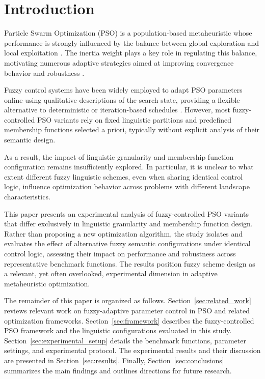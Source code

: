 \section{Introduction}


Particle Swarm Optimization (PSO) is a population-based metaheuristic whose performance is strongly influenced by the balance between global exploration and local exploitation \cite{kennedy1995particle}. The inertia weight plays a key role in regulating this balance, motivating numerous adaptive strategies aimed at improving convergence behavior and robustness \cite{shi1998modified}.

Fuzzy control systems have been widely employed to adapt PSO parameters online using qualitative descriptions of the search state, providing a flexible alternative to deterministic or iteration-based schedules \cite{shi2001fuzzy}. However, most fuzzy-controlled PSO variants rely on fixed linguistic partitions and predefined membership functions selected a priori, typically without explicit analysis of their semantic design.

As a result, the impact of linguistic granularity and membership function configuration remains insufficiently explored. In particular, it is unclear to what extent different fuzzy linguistic schemes, even when sharing identical control logic, influence optimization behavior across problems with different landscape characteristics.

This paper presents an experimental analysis of fuzzy-controlled PSO variants that differ exclusively in linguistic granularity and membership function design. Rather than proposing a new optimization algorithm, the study isolates and evaluates the effect of alternative fuzzy semantic configurations under identical control logic, assessing their impact on performance and robustness across representative benchmark functions. The results position fuzzy scheme design as a relevant, yet often overlooked, experimental dimension in adaptive metaheuristic optimization.

The remainder of this paper is organized as follows. Section~\ref{sec:related_work} reviews relevant work on fuzzy-adaptive parameter control in PSO and related optimization frameworks. Section~\ref{sec:framework} describes the fuzzy-controlled PSO framework and the linguistic configurations evaluated in this study. Section~\ref{sec:experimental_setup} details the benchmark functions, parameter settings, and experimental protocol. The experimental results and their discussion are presented in Section~\ref{sec:results}. Finally, Section~\ref{sec:conclusions} summarizes the main findings and outlines directions for future research.